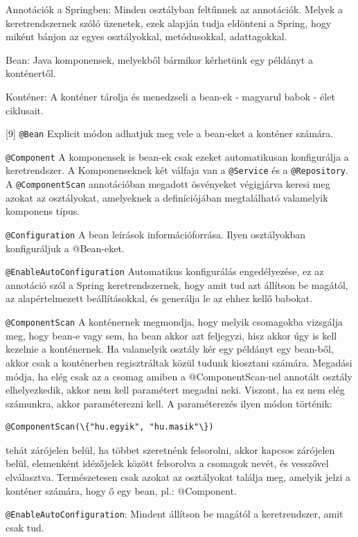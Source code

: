 Annotációk a Springben: Minden osztályban feltűnnek az annotációk. Melyek a keretrendszernek szóló üzenetek, ezek alapján tudja eldönteni a Spring, hogy miként bánjon az egyes osztályokkal, metódusokkal, adattagokkal.

Bean: Java komponensek, melyekből bármikor kérhetünk egy példányt a konténertől.

Konténer: A konténer tárolja és menedzseli a bean-ek - magyarul babok - élet ciklusait.

[9] \texttt{@Bean} Explicit módon adhatjuk meg vele a bean-eket a konténer számára.

\texttt{@Component} A komponensek is bean-ek csak ezeket automatikusan konfigurálja a keretrendszer. A Komponenseknek két válfaja van a \texttt{@Service} és a \texttt{@Repository}. A \texttt{@ComponentScan} annotációban megadott ösvényeket végigjárva keresi meg azokat az osztályokat, amelyeknek a definíciójában megtalálható valamelyik komponens típus.

\texttt{@Configuration} A bean leírások információforrása. Ilyen osztályokban konfiguráljuk a @Bean-eket.

\texttt{@EnableAutoConfiguration} Automatikus konfigurálás engedélyezése, ez az annotáció szól a Spring keretrendszernek, hogy amit tud azt állítson be magától, az alapértelmezett beállításokkal, és generálja le az ehhez kellő babokat.

\texttt{@ComponentScan} A konténernek megmondja, hogy melyik csomagokba vizsgálja meg, hogy bean-e vagy sem, ha bean akkor azt feljegyzi, hisz akkor úgy is kell kezelnie  a konténernek. Ha valamelyik osztály kér egy példányt egy bean-ből, akkor csak a konténerben regisztráltak közül tudunk kiosztani számára. Megadási módja, ha elég csak az a csomag amiben a @ComponentScan-nel annotált osztály elhelyezkedik, akkor nem kell paramétert megadni neki. Viszont, ha ez nem elég számunkra, akkor paraméterezni kell. A paraméterezés ilyen módon történik:
\begin{verbatim}
@ComponentScan(\{"hu.egyik", "hu.masik"\})
\end{verbatim}
tehát zárójelen belül, ha többet szeretnénk felsorolni, akkor kapcsos zárójelen belül, elemenként idézőjelek között felsorolva a csomagok nevét, és vesszővel elválasztva. Természetesen csak azokat az osztályokat találja meg, amelyik jelzi a konténer számára, hogy ő egy bean, pl.: @Component.

\texttt{@EnableAutoConfiguration}: Mindent állítson be magától a keretrendszer, amit csak tud.

